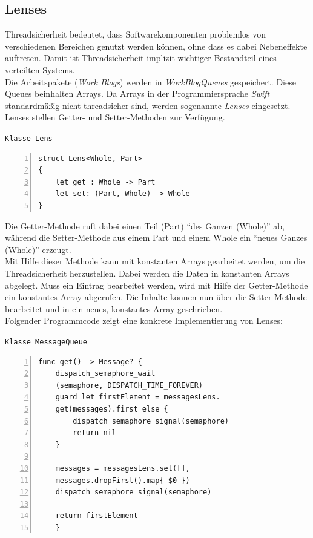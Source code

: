 \subsection{Lenses}
Threadsicherheit bedeutet, dass Softwarekomponenten problemlos von verschiedenen Bereichen genutzt werden können, ohne dass es dabei Nebeneffekte auftreten. Damit ist Threadsicherheit implizit wichtiger Bestandteil eines verteilten Systems. \\
Die Arbeitspakete (\emph{Work Blogs}) werden in \emph{WorkBlogQueues} gespeichert. Diese Queues beinhalten Arrays. Da Arrays in der Programmiersprache \emph{Swift} standardmäßig nicht threadsicher sind, werden sogenannte \emph{Lenses} eingesetzt. \\
Lenses stellen Getter- und Setter-Methoden zur Verfügung. 

\texttt{Klasse Lens}
\begin{lstlisting}[basicstyle=\ttfamily,numbers=left,numberstyle=\footnotesize\ttfamily,backgroundcolor=\color{sourcegray}]
struct Lens<Whole, Part> 
{
	let get : Whole -> Part
	let set: (Part, Whole) -> Whole
}
\end{lstlisting}

Die Getter-Methode ruft dabei einen Teil (Part) \enquote{des Ganzen (Whole)} ab, während die Setter-Methode aus einem Part und einem Whole ein \enquote{neues Ganzes (Whole)} erzeugt. \\
Mit Hilfe dieser Methode kann mit konstanten Arrays gearbeitet werden, um die Threadsicherheit herzustellen. Dabei werden die Daten in konstanten Arrays abgelegt. Muss ein Eintrag bearbeitet werden, wird mit Hilfe der Getter-Methode ein konstantes Array abgerufen. Die Inhalte können nun über die Setter-Methode bearbeitet und in ein neues, konstantes Array geschrieben.\\
Folgender Programmcode zeigt eine konkrete Implementierung von Lenses:

\texttt{Klasse MessageQueue}
\begin{lstlisting}[basicstyle=\ttfamily,numbers=left,numberstyle=\footnotesize\ttfamily,backgroundcolor=\color{sourcegray}]
func get() -> Message? {
	dispatch_semaphore_wait
	(semaphore, DISPATCH_TIME_FOREVER)
	guard let firstElement = messagesLens.
	get(messages).first else {
		dispatch_semaphore_signal(semaphore)
        return nil
	}
        
	messages = messagesLens.set([], 
	messages.dropFirst().map{ $0 })
	dispatch_semaphore_signal(semaphore)
            
	return firstElement
    }
\end{lstlisting}

